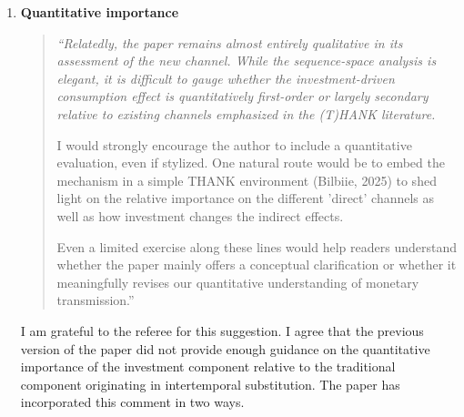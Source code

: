 \documentclass[11pt]{article}
\begin{document}
\begin{enumerate} [  1.]
Third, the general-equilibrium propagation of the investment component depends on which households receive the income generated by investment and which households ultimately finance it, and on their respective MPCs. In the TANK model, this is summarized by the parameter $\xi$. The corresponding moments in richer micro data are the covariance between household MPCs and their shares in aggregate labor income, and the covariance between household MPCs and their ownership of the corporate securities through which investment is financed. The investment component is stronger, all else equal, when high-MPC households receive a larger share of labor income but hold a smaller share of these financial claims.

Taken together, these empirical counterparts clarify how the relative strength of the two components can be disciplined with micro data and how differences in income and asset-ownership structures translate into differences in the strength of the investment component.

\item  \textbf{Quantitative importance}

\begin{quote}
\itshape ``Relatedly, the paper remains almost entirely qualitative in its assessment of the new channel. While the sequence-space analysis is elegant, it is difficult to gauge whether the investment-driven consumption effect is quantitatively first-order or largely secondary relative to existing channels emphasized in the (T)HANK literature.

I would strongly encourage the author to include a quantitative evaluation, even if stylized. One natural route would be to embed the mechanism in a simple THANK environment (Bilbiie, 2025) to shed light on the relative importance on the different 'direct' channels as well as how investment changes the indirect effects.

Even a limited exercise along these lines would help readers understand whether the paper mainly offers a conceptual clarification or whether it meaningfully revises our quantitative understanding of monetary transmission.''
\end{quote}

I am grateful to the referee for this suggestion. I agree that the previous version of the paper did not provide enough guidance on the quantitative importance of the investment component relative to the traditional component originating in intertemporal substitution. The paper has incorporated this comment in two ways.


\end{enumerate}
\end{document}
